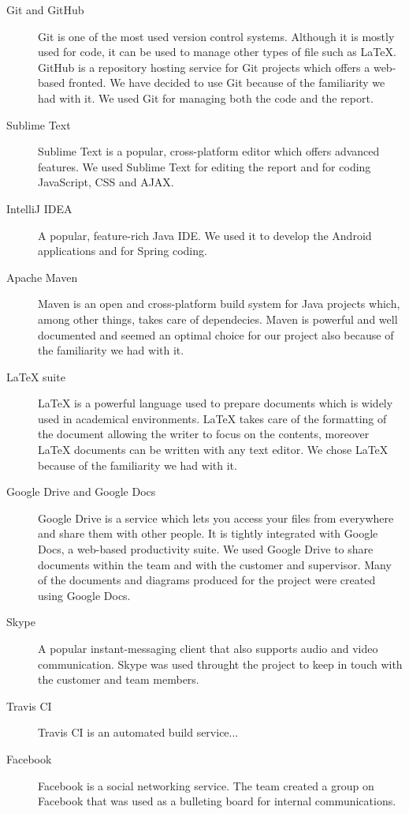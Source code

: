 \begin{description}

\item[Git and GitHub]
Git is one of the most used version control systems. Although it is mostly used for code, it can be used to manage other types of file such as LaTeX. GitHub is a repository hosting service for Git projects which offers a web-based fronted. We have decided to use Git because of the familiarity we had with it. We used Git for managing both the code and the report.

\item[Sublime Text]
Sublime Text is a popular, cross-platform editor which offers advanced features.
We used Sublime Text for editing the report and for coding JavaScript, CSS and AJAX.

\item[IntelliJ IDEA]
A popular, feature-rich Java IDE. We used it to develop the Android applications and for Spring coding.

\item[Apache Maven]
Maven is an open and cross-platform build system for Java projects which, among other things, takes care of dependecies. Maven is powerful and well documented and seemed an optimal choice for our project also because of the familiarity we had with it.

\item[LaTeX suite]
LaTeX is a powerful language used to prepare documents which is widely used in academical environments. LaTeX takes care of the formatting of the document allowing the writer to focus on the contents, moreover LaTeX documents can be written with any text editor.
We chose LaTeX because of the familiarity we had with it.

\item[Google Drive and Google Docs]
Google Drive is a service which lets you access your files from everywhere and share them with other people. It is tightly integrated with Google Docs, a web-based productivity suite. We used Google Drive to share documents within the team and with the customer and supervisor.
Many of the documents and diagrams produced for the project were created using Google Docs.

\item[Skype]
A popular instant-messaging client that also supports audio and video communication.
Skype was used throught the project to keep in touch with the customer and team members.

\item[Travis CI]
Travis CI is an automated build service...

\item[Facebook]
Facebook is a social networking service. The team created a group on Facebook that was used as a bulleting board for internal communications.


\end{description}
